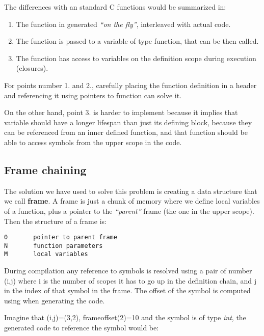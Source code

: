 \documentclass[letterpaper,10pt,english]{sphinxmanual}
\begin{document}
The differences with an standard C functions would be summarized in:
\begin{enumerate}
\item {} 
The function in generated \emph{``on the fly''}, interleaved with actual
code.

\item {} 
The function is passed to a variable of type function, that can be
then called.

\item {} 
The function has access to variables on the definition scope during
execution (closures).

\end{enumerate}

For points number 1. and 2., carefully placing the function definition
in a header and referencing it using pointers to function can solve
it.

On the other hand, point 3. is harder to implement because it implies
that variable should have a longer lifespan than just its defining
block, because they can be referenced from an inner defined function,
and that function should be able to access symbols from the upper
scope in the code.


\subsection{Frame chaining}
\label{documentation:frame-chaining}
The solution we have used to solve this problem is creating a data
structure that we call \textbf{frame}. A frame is just a chunk of memory
where we define local variables of a function, plus a pointer to the
\emph{``parent''} frame (the one in the upper scope). Then the structure of a
frame is:

\begin{Verbatim}[commandchars=\\\{\}]
0       pointer to parent frame
N       function parameters
M       local variables
\end{Verbatim}

During compilation any reference to symbols is resolved using a pair
of number (i,j) where i is the number of scopes it has to go up in the
definition chain, and j in the index of that symbol in the frame. The offset of the symbol is computed using when generating the code.

Imagine that (i,j)=(3,2), frameoffset(2)=10 and the symbol is of type \emph{int}, the generated code to reference the symbol would be:
\end{document}

